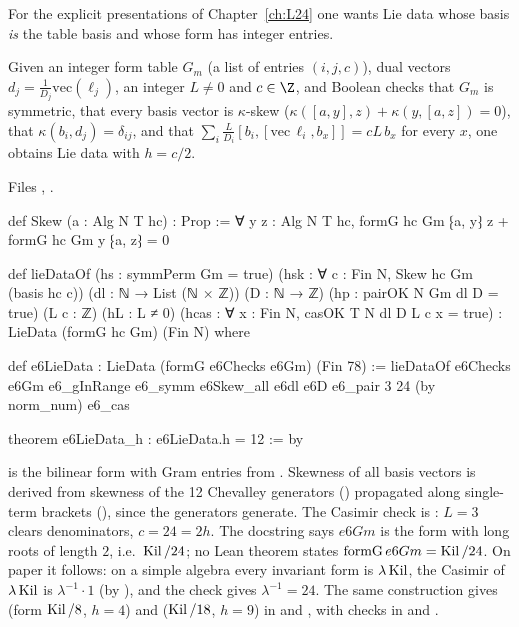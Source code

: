 For the explicit presentations of Chapter~\ref{ch:L24} one wants Lie data whose basis \emph{is} the table basis and whose form has integer entries.

\begin{definition}\label{l23:def:lieDataOf}
Given an integer form table $G_m$ (a list of entries $(i,j,c)$), dual vectors $d_j=\frac1{D_j}\mathrm{vec}(\ell_j)$, an integer $L\ne0$ and
$c\in\Z$, and Boolean checks that $G_m$ is symmetric, that every basis vector is $\kappa$-skew ($\kappa([a,y],z)+\kappa(y,[a,z])=0$), that
$\kappa(b_i,d_j)=\delta_{ij}$, and that $\sum_i\frac{L}{D_i}[b_i,[\mathrm{vec}\,\ell_i,b_x]]=cL\,b_x$ for every $x$, one obtains Lie data with
$h=c/2$.
\end{definition}
\noindent Files ,
.
\begin{leancode}
def Skew (a : Alg N T hc) : Prop :=
  ∀ y z : Alg N T hc, formG hc Gm ⁅a, y⁆ z + formG hc Gm y ⁅a, z⁆ = 0

def lieDataOf (hs : symmPerm Gm = true) (hsk : ∀ c : Fin N, Skew hc Gm (basis hc c))
    (dl : ℕ → List (ℕ × ℤ)) (D : ℕ → ℤ) (hp : pairOK N Gm dl D = true) (L c : ℤ) (hL : L ≠ 0)
    (hcas : ∀ x : Fin N, casOK T N dl D L c x = true) : LieData (formG hc Gm) (Fin N) where

def e6LieData : LieData (formG e6Checks e6Gm) (Fin 78) :=
  lieDataOf e6Checks e6Gm e6_gInRange e6_symm e6Skew_all e6dl e6D e6_pair 3 24 (by norm_num) e6_cas

theorem e6LieData_h : e6LieData.h = 12 := by
\end{leancode}

\begin{dictionary}
 is the bilinear form with Gram entries from . Skewness of all basis vectors is derived from skewness of the 12
Chevalley generators () propagated along single-term brackets (), since the generators generate.
The Casimir check is : $L=3$ clears denominators, $c=24=2h$. The docstring says $e6Gm$ is the form with long roots of length
$2$, i.e.\ $\operatorname{Kil}/24$; no Lean theorem states $\mathrm{formG}\,e6Gm=\operatorname{Kil}/24$. On paper it follows: on a simple algebra every invariant form
is $\lambda\operatorname{Kil}$, the Casimir of $\lambda\operatorname{Kil}$ is $\lambda^{-1}\cdot1$ (by ), and the check gives $\lambda^{-1}=24$. The same
construction gives  (form $\operatorname{Kil}/8$, $h=4$) and  ($\operatorname{Kil}/18$, $h=9$) in
 and , with checks in  and
.
\end{dictionary}

